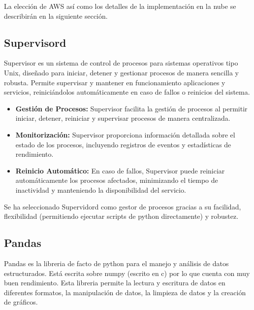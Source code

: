 La elección de AWS así como los detalles de la implementación en la nube se describirán en la siguiente sección.

\subsection{Supervisord}
Supervisor es un sistema de control de procesos para sistemas operativos tipo Unix, diseñado para iniciar, detener y gestionar procesos de manera sencilla y robusta. Permite supervisar y mantener en funcionamiento aplicaciones y servicios, reiniciándolos automáticamente en caso de fallos o reinicios del sistema.

\begin{itemize}
	\item \textbf{Gestión de Procesos:} Supervisor facilita la gestión de procesos al permitir iniciar, detener, reiniciar y supervisar procesos de manera centralizada.
	\item \textbf{Monitorización:} Supervisor proporciona información detallada sobre el estado de los procesos, incluyendo registros de eventos y estadísticas de rendimiento.
	\item \textbf{Reinicio Automático:} En caso de fallos, Supervisor puede reiniciar automáticamente los procesos afectados, minimizando el tiempo de inactividad y manteniendo la disponibilidad del servicio.
\end{itemize}

Se ha seleccionado Supervidord como gestor de procesos gracias a su facilidad, flexibilidad (permitiendo ejecutar scripts de python directamente) y robustez.
\subsection{Pandas}
Pandas es la libreria de facto de python para el manejo y análisis de datos estructurados. Está escrita sobre numpy (escrito en c) por lo que cuenta con muy buen rendimiento. Esta libreria permite la lectura y escritura de datos en diferentes formatos, la manipulación de datos, la limpieza de datos y la creación de gráficos.
